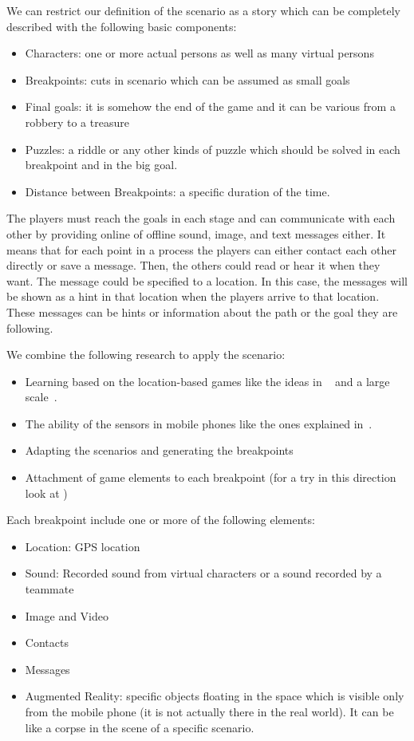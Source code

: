 \documentclass[conference]{IEEEtran}
\begin{document}
We can restrict our definition of the scenario as a story which
can be completely described with the following basic components:
\begin{itemize}
\item Characters: one or more actual persons as well as many virtual persons
\item Breakpoints: cuts in scenario which can be assumed as small goals 
\item Final goals: it is somehow the end of the game and 
it can be various from a robbery to a treasure
\item Puzzles: a riddle or any other kinds of puzzle which should be solved in each 
      breakpoint and in the big goal.
\item Distance between Breakpoints: a specific duration of the time.
\end{itemize}

The players must reach the goals in each stage and can communicate with each other by providing online of offline sound, image, and text messages either. It means that for each point in a process the players can either contact each other directly or save a message. Then, the others could read or hear it when they want. The message could be specified to a location. In this case, the messages will be shown as a hint in that location when the players arrive to that location. These messages can be hints or information about the path or the goal they are following.

We combine the following research to apply the scenario:
\begin{itemize}
\item Learning based on the location-based games like the ideas in ~\cite{rexplorer} and 
a large scale~\cite{scal-loc-g}.
\item The ability of the sensors in mobile phones like the ones explained in~\cite{sensors}.
\item Adapting the scenarios and generating the breakpoints
\item Attachment of game elements to each breakpoint (for a try in this direction 
look at \cite{totem})
\end{itemize}


Each breakpoint include one or more of the following elements:
\begin{itemize}
\item Location: GPS location
\item Sound: Recorded sound from virtual characters or a sound
recorded by a teammate
\item Image and Video
\item Contacts
\item Messages
\item Augmented Reality: specific objects floating in the space which is 
visible only from the mobile phone (it is not actually there in the real world).
It can be like a corpse in the scene of a specific scenario.
\end{itemize}
\end{document}
